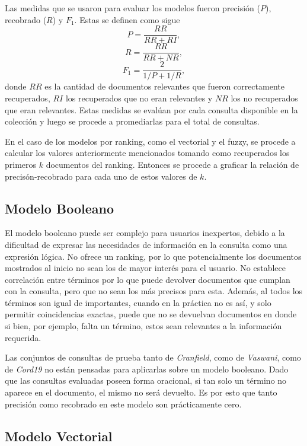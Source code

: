 \documentclass{llncs}
\begin{document}
	Las medidas que se usaron para evaluar los modelos fueron precisi\'on ($P$), recobrado ($R$) y $F_1$. Estas se definen como sigue
	\[
	P = \frac{RR}{RR + RI},
	\]
	\[
	R = \frac{RR}{RR + NR},
	\]
	\[
	F_1 = \frac{2}{1/P + 1/R},
	\]
	donde $RR$ es la cantidad de documentos relevantes que fueron correctamente recuperados, $RI$ los recuperados que no eran relevantes y $NR$ los no recuperados que eran relevantes. Estas medidas se eval\'uan por cada consulta disponible en la colecci\'on y luego se procede a promediarlas para el total de consultas.
	
	En el caso de los modelos por ranking, como el vectorial y el fuzzy, se procede a calcular los valores anteriormente mencionados tomando como recuperados los primeros $k$ documentos del ranking. Entonces se procede a graficar la relaci\'on de precis\'on-recobrado para cada uno de estos valores de $k$.
	
	\subsection{Modelo Booleano}
	
	El modelo booleano puede ser complejo para usuarios inexpertos, debido a la dificultad de expresar las necesidades de informaci\'on en la consulta como una expresi\'on l\'ogica. No ofrece un ranking, por lo que potencialmente los documentos mostrados al inicio no sean los de mayor inter\'es para el usuario. No establece correlaci\'on entre t\'erminos por lo que puede devolver documentos que cumplan con la consulta, pero que no sean los m\'as precisos para esta. Adem\'as, al todos los t\'erminos son igual de importantes, cuando en la pr\'actica no es as\'i, y solo permitir coincidencias exactas, puede que no se devuelvan documentos en donde si bien, por ejemplo, falta un t\'ermino, estos sean relevantes a la informaci\'on requerida.
	
	Las conjuntos de consultas de prueba tanto de \emph{Cranfield}, como de \emph{Vaswani}, como de \emph{Cord19} no est\'an pensadas para aplicarlas sobre un modelo booleano. Dado que las consultas evaluadas poseen forma oracional, si tan solo un t\'ermino no aparece en el documento, el mismo no ser\'a devuelto. Es por esto que tanto precisi\'on como recobrado en este modelo son prácticamente cero.
	
	
	\subsection{Modelo Vectorial}
\end{document}
